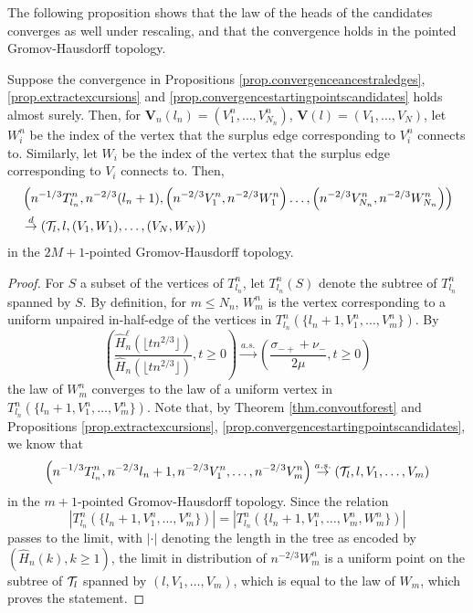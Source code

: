 The following proposition shows that the law of the heads of the candidates converges as well under rescaling, and that the convergence holds in the pointed Gromov-Hausdorff topology. 
\begin{proposition}\label{prop.convergenceheadscandidates}
Suppose the convergence in Propositions \ref{prop.convergenceancestraledges}, \ref{prop.extractexcursions} and \ref{prop.convergencestartingpointscandidates} holds almost surely. Then, for $\mathbf{V}_n(l_n)=(V^n_1,\dots, V^n_{N_n})$, $\mathbf{V}(l)=(V_1,\dots, V_{N})$, let $W^n_i$ be the index of the vertex that the surplus edge corresponding to $V^n_i$ connects to. Similarly, let $W_i$ be the index of the vertex that the surplus edge corresponding to $V_i$ connects to. Then, 
\begin{align*}&\left(n^{-1/3}T^n_{l_n}, n^{-2/3}(l_n+1), \left(n^{-2/3}V^n_1,n^{-2/3}W^n_1\right) \dots, \left(n^{-2/3}V^n_{N_n}, n^{-2/3}W^n_{N_n}\right)\right)\\
&\overset{d}{\to}\left(\cT_l, l, (V_1,W_1),\dots, (V_{N},W_{N})\right)\end{align*}
in the $2M+1$-pointed Gromov-Hausdorff topology. 
\end{proposition}
\begin{proof}
For $S$ a subset of the vertices of $T^n_{l_n}$, let $T^n_{l_n}(S)$ denote the subtree of $T^n_{l_n}$ spanned by $S$. By definition, for $m\leq N_n$, $W^n_m$ is the vertex corresponding to a uniform unpaired in-half-edge of the vertices in $T^n_{l_n}\left(\{l_n+1,V^n_1,\dots,V^n_{m}\}\right)$. By 
$$\left(\frac{\hat{H}_n^\ell\left(\lfloor t n^{2/3}\rfloor \right)}{\hat{H}_n\left(\lfloor t n^{2/3}\rfloor \right)},t\geq 0\right)\overset{a.s.}{\to} \left(\frac{\sigma_{-+}+\nu_-}{2\mu},t\geq 0\right)$$
the law of $W^n_m$ converges to the law of a uniform vertex in $T^n_{l_n}\left(\{l_n+1,V^n_1,\dots,V^n_{m}\}\right)$. 
Note that, by Theorem \ref{thm.convoutforest} and  Propositions \ref{prop.extractexcursions}, \ref{prop.convergencestartingpointscandidates}, we know that
$$\left(n^{-1/3}T^n_{l_n},n^{-2/3}l_n+1,n^{-2/3}V^n_1,\dots,n^{-2/3}V^n_{m}\right)\overset{a.s.}{\to}\left({\mathcal T}_l, l,V_1,\dots,V_m\right)$$
in the $m+1$-pointed Gromov-Hausdorff topology. Since the relation $$\left|T^n_{l_n}\left(\{l_n+1,V^n_1,\dots,V^n_{m}\}\right)\right|=\left|T^n_{l_n}\left(\{l_n+1,V^n_1,\dots,V^n_{m}, W^n_{m}\}\right)\right|$$ passes to the limit, with $|\cdot|$ denoting the length in the tree as encoded by $(\hat{H}_n(k),k\geq 1)$, the limit in distribution of $n^{-2/3}W^n_m$ is a uniform point on the subtree of ${\mathcal T}_l$ spanned by $\left(l,V_1,\dots,V_m\right)$, which is equal to the law of $W_m$, which proves the statement.

\end{proof}
